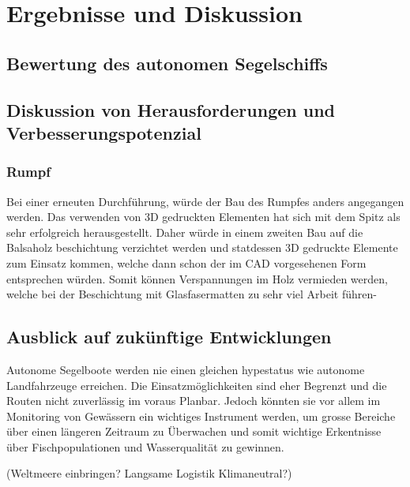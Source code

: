 

\chapter{Ergebnisse und Diskussion }
\label{chap:diskussion}

\section{Bewertung des autonomen Segelschiffs}

\section{Diskussion von Herausforderungen und Verbesserungspotenzial}
\subsection{Rumpf}
Bei einer erneuten Durchführung, würde der Bau des Rumpfes anders angegangen werden. Das verwenden von 3D gedruckten Elementen hat sich mit dem Spitz als sehr erfolgreich herausgestellt. Daher würde in einem zweiten Bau auf die Balsaholz beschichtung verzichtet werden und statdessen 3D gedruckte Elemente zum Einsatz kommen, welche dann schon der im CAD vorgesehenen Form entsprechen würden. Somit können Verspannungen im Holz vermieden werden, welche bei der Beschichtung mit Glasfasermatten zu sehr viel Arbeit führen-  

\section{Ausblick auf zukünftige Entwicklungen}
Autonome Segelboote werden nie einen gleichen hypestatus wie autonome Landfahrzeuge erreichen. Die Einsatzmöglichkeiten sind eher Begrenzt und die Routen nicht zuverlässig im voraus Planbar. Jedoch könnten sie vor allem im Monitoring von Gewässern ein wichtiges Instrument werden, um grosse Bereiche über einen längeren Zeitraum zu Überwachen und somit wichtige Erkentnisse über Fischpopulationen und Wasserqualität zu gewinnen.

(Weltmeere einbringen? Langsame Logistik Klimaneutral?)
